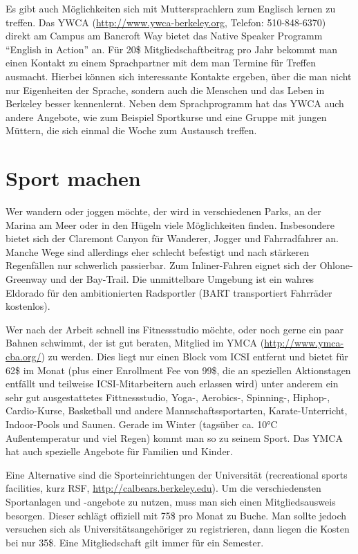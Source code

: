 \documentclass[a4paper]{scrreprt}
\begin{document}
Es gibt auch Möglichkeiten sich mit Muttersprachlern zum Englisch
lernen zu treffen. Das YWCA (\url{http://www.ywca-berkeley.org}, Telefon:
510-848-6370) direkt am Campus am Bancroft Way bietet das Native
Speaker Programm ``English in Action'' an. Für 20\$
Mitgliedschaftbeitrag pro Jahr bekommt man einen Kontakt zu einem
Sprachpartner mit dem man Termine für Treffen ausmacht. Hierbei können
sich interessante Kontakte ergeben, über die man nicht nur Eigenheiten
der Sprache, sondern auch die Menschen und das Leben in Berkeley
besser kennenlernt. Neben dem Sprachprogramm hat das YWCA auch
andere Angebote, wie zum Beispiel Sportkurse und eine Gruppe mit
jungen Müttern, die sich einmal die Woche zum Austausch treffen. 

\section{Sport machen}

Wer wandern oder joggen möchte, der wird in verschiedenen Parks, an
der Marina am Meer oder in den Hügeln viele Möglichkeiten
finden. Insbesondere bietet sich der Claremont Canyon für Wanderer,
Jogger und Fahrradfahrer an. Manche Wege sind allerdings eher schlecht
befestigt und nach stärkeren Regenfällen nur schwerlich
passierbar. Zum Inliner-Fahren eignet sich der Ohlone-Greenway und der
Bay-Trail. Die unmittelbare Umgebung ist ein wahres Eldorado für den
ambitionierten Radsportler (BART transportiert Fahrräder kostenlos).

Wer nach der Arbeit schnell ins Fitnessstudio möchte, oder noch gerne
ein paar Bahnen schwimmt, der ist gut beraten, Mitglied im YMCA
(\url{http://www.ymca-cba.org/}) zu werden. Dies liegt nur einen Block
vom ICSI entfernt und bietet für 62\$ im Monat (plus einer Enrollment
Fee von 99\$, die an speziellen Aktionstagen entfällt und teilweise
ICSI-Mitarbeitern auch erlassen wird) unter anderem ein sehr gut
ausgestattetes Fittnessstudio, Yoga-, Aerobics-, Spinning-, Hiphop-,
Cardio-Kurse, Basketball und andere Mannschaftssportarten,
Karate-Unterricht, Indoor-Pools und Saunen. Gerade im Winter (tagsüber
ca. 10°C Außentemperatur und viel Regen) kommt man so zu seinem
Sport. Das YMCA hat auch spezielle Angebote für Familien und Kinder. 

Eine Alternative sind die Sporteinrichtungen der Universität
(recreational sports facilities, kurz RSF,
\url{http://calbears.berkeley.edu}). Um die verschiedensten
Sportanlagen und -angebote zu nutzen, muss man sich einen
Mitgliedsausweis besorgen. Dieser schlägt offiziell mit 75\$ pro
Monat zu Buche. Man sollte jedoch versuchen sich als
Universitätsangehöriger zu registrieren, dann liegen die Kosten bei
nur 35\$. Eine Mitgliedschaft gilt immer für ein Semester.
\end{document}
